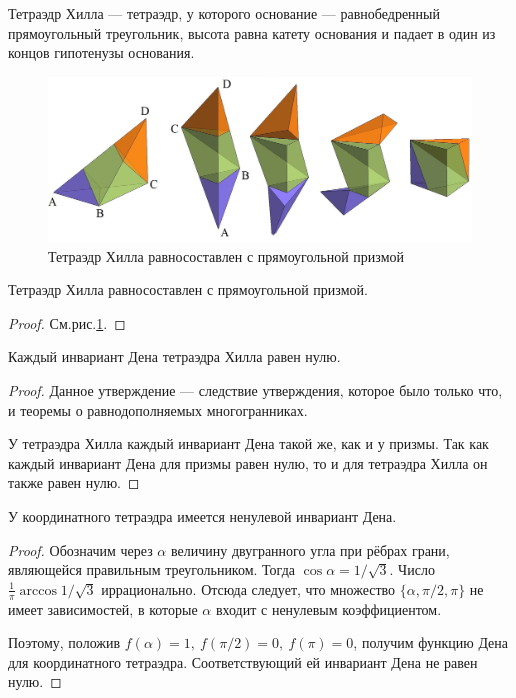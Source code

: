 \begin{definition}
    Тетраэдр Хилла — тетраэдр, у которого основание — равнобедренный прямоугольный треугольник, высота равна катету основания и падает в один из концов гипотенузы основания.
\end{definition} 
\begin{figure}[h]
    \centering
    \includegraphics[scale=0.2]{images/c9.8.png}
    \caption{Тетраэдр Хилла равносоставлен с прямоугольной призмой}
    \label{fig:c9.8}
\end{figure}

\begin{statement}
    Тетраэдр Хилла равносоставлен с прямоугольной призмой.
\end{statement} 
\begin{proof}
    См.рис.\ref{fig:c9.8}.
\end{proof} 

\begin{statement}
    Каждый инвариант Дена тетраэдра Хилла равен нулю.
\end{statement} 
\begin{proof}
    Данное утверждение — следствие утверждения, которое было только что, и теоремы о равнодополняемых многогранниках.

    У тетраэдра Хилла каждый инвариант Дена такой же, как и у призмы. Так как каждый инвариант Дена для призмы равен нулю, то и для тетраэдра Хилла он также равен нулю.
\end{proof} 

\begin{statement}
    У координатного тетраэдра имеется ненулевой инвариант Дена.
\end{statement} 
\begin{proof}
    Обозначим через $\alpha$ величину двугранного угла при рёбрах грани, являющейся правильным треугольником. Тогда $\cos{\alpha} = 1 / \sqrt{3}$. Число $\frac{1}{\pi} \arccos{1/\sqrt{3}}$ иррационально. Отсюда следует, что множество $\{\alpha, \pi/2, \pi\}$ не имеет зависимостей, в которые $\alpha$ входит с ненулевым коэффициентом.

    Поэтому, положив $f(\alpha) = 1, \ f(\pi/2) = 0, \ f(\pi) = 0$, получим функцию Дена для координатного тетраэдра. Соответствующий ей инвариант Дена не равен нулю.
\end{proof} 

